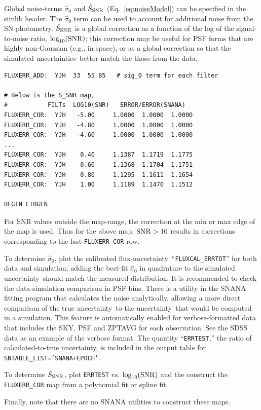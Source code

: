 \documentclass[12pt]{article}
\newcommand{\unc}{uncertainty}
\newcommand{\uncs}{uncertainties}
\newcommand{\obs}{observation}
\newcommand{\sigOFF}{\hat\sigma_0}
\newcommand{\SSNR}{\hat{S}_{\rm SNR}}
\newcommand{\logSNR}{\log_{10}({\rm SNR})}
\begin{document}
{Global noise-terms $\sigOFF$ and $\SSNR$ (Eq.~\ref{eq:noiseModel})
can be specified in the simlib header.
The $\sigOFF$ term can be used to account for
additional noise from the SN-photometry.
$\SSNR$ is a global correction as a function of
the log of the signal-to-noise ratio, $\logSNR$;
this correction may be useful for PSF forms
that are highly non-Gaussian (e.g., in space),
or as a global correction so that the simulated
\uncs\ better match the those from the data.

%
\begin{Verbatim}[frame=single]
FLUXERR_ADD:  YJH  33  55 85   # sig_0 term for each filter

# Below is the S_SNR map,
#           FILTs  LOG10(SNR)   ERROR/ERROR(SNANA)
FLUXERR_COR:  YJH   -5.00     1.0000  1.0000  1.0000
FLUXERR_COR:  YJH   -4.80     1.0000  1.0000  1.0000
FLUXERR_COR:  YJH   -4.60     1.0000  1.0000  1.0000
...
FLUXERR_COR:  YJH    0.40     1.1387  1.1719  1.1775
FLUXERR_COR:  YJH    0.60     1.1368  1.1704  1.1751
FLUXERR_COR:  YJH    0.80     1.1295  1.1611  1.1654
FLUXERR_COR:  YJH    1.00     1.1189  1.1470  1.1512

BEGIN LIBGEN
\end{Verbatim}
%
For SNR values outside the map-range, the correction at the 
min or max edge of the map is used.
Thus for the above map, ${\rm SNR} > 10$ results in corrections
corresponding to the last {\tt FLUXERR\_COR} row.

\bigskip
To determine $\sigOFF$, plot the calibrated flux-\unc\ 
``{\tt FLUXCAL\_ERRTOT}''  
for both data and simulation; 
adding the best-fit $\sigOFF$ in quadrature to the simulated \unc\ 
should match the measured distribution. It is recommended
to check the data-simulation comparison in PSF bins.
There is a utility in the SNANA fitting program that calculates 
the noise analytically,  allowing a more direct comparison
of the true \unc\ to the \unc\ that would be computed
in a simulation. This feature is automatically enabled
for verbose-formatted data that includes the SKY, PSF and
ZPTAVG for each \obs. See the SDSS data as an example
of the  verbose format. The quantity ``{\tt ERRTEST},''
the ratio of calculated-to-true \unc, is included in the output
table for {\tt SNTABLE\_LIST='SNANA+EPOCH'}.

To determine $\SSNR$, plot {\tt ERRTEST} vs. $\logSNR$
and the construct the {\tt FLUXERR\_COR} map from 
a polynomial fit or spline fit.

Finally, note that there are no SNANA utilities to
construct these maps.

}
\end{document}

